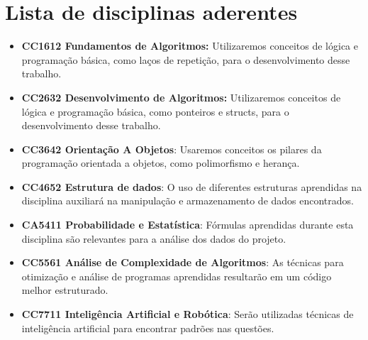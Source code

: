 \documentclass[11pt,a4,oneside]{article}
\begin{document}
\section*{Lista de disciplinas aderentes}

\begin{itemize}

\item \textbf{CC1612 Fundamentos de Algoritmos: }Utilizaremos conceitos de lógica e programação básica, como laços de repetição, para o desenvolvimento desse trabalho.

\item \textbf{CC2632 Desenvolvimento de Algoritmos: } Utilizaremos conceitos de lógica e programação básica, como ponteiros e structs, para o desenvolvimento desse trabalho.

\item \textbf{CC3642 Orientação A Objetos}: Usaremos conceitos os pilares da programação orientada a objetos, como polimorfismo e herança.

\item \textbf{CC4652 Estrutura de dados}: O uso de diferentes estruturas aprendidas na disciplina auxiliará na manipulação e armazenamento de dados encontrados.

\item \textbf{CA5411 Probabilidade e Estatística}: Fórmulas aprendidas durante esta disciplina são relevantes para a análise dos dados do projeto.

\item \textbf{CC5561 Análise de Complexidade de Algoritmos}: As técnicas para otimização e análise de programas aprendidas resultarão em um código melhor estruturado.

\item \textbf{CC7711 Inteligência Artificial e Robótica}: Serão utilizadas técnicas de inteligência artificial para encontrar padrões nas questões.

\end{itemize}
\end{document}
